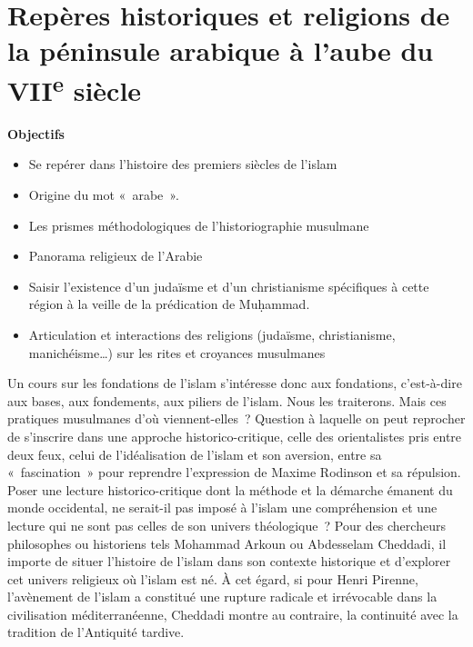 

\chapter[Repères historiques]{Repères historiques et religions de la péninsule arabique à l'aube du VII\textsuperscript{e} siècle}


\textbf{Objectifs}

\begin{itemize}
\item
  Se repérer dans l'histoire des premiers siècles de l'islam
\item
  Origine du mot «~arabe~».
\item
  Les prismes méthodologiques de l'historiographie musulmane
\item
  Panorama religieux de l'Arabie
\item
  Saisir l'existence d'un judaïsme et d'un christianisme spécifiques à
  cette région à la veille de la prédication de Muḥammad.
\item
  Articulation et interactions des religions (judaïsme, christianisme,
  manichéisme\ldots) sur les rites et croyances musulmanes
\end{itemize}



Un cours sur les fondations de l'islam s'intéresse donc aux fondations,
c'est-à-dire aux bases, aux fondements, aux piliers de l'islam. Nous les
traiterons. Mais ces pratiques musulmanes d'où viennent-elles~? Question
à laquelle on peut reprocher de s'inscrire dans une approche
historico-critique, celle des orientalistes pris entre deux feux, celui
de l'idéalisation de l'islam et son aversion, entre sa «~fascination~»
pour reprendre l'expression de Maxime Rodinson et sa répulsion. Poser
une lecture historico-critique dont la méthode et la démarche émanent du
monde occidental, ne serait-il pas imposé à l'islam une compréhension et
une lecture qui ne sont pas celles de son univers théologique~? Pour des
chercheurs philosophes ou historiens tels Mohammad Arkoun ou Abdesselam
Cheddadi, il importe de situer l'histoire de l'islam dans son contexte
historique et d'explorer cet univers religieux où l'islam est né. À cet
égard, si pour Henri Pirenne, l'avènement de l'islam a constitué une
rupture radicale et irrévocable dans la civilisation méditerranéenne,
Cheddadi montre au contraire, la continuité avec la tradition de
l'Antiquité tardive.

